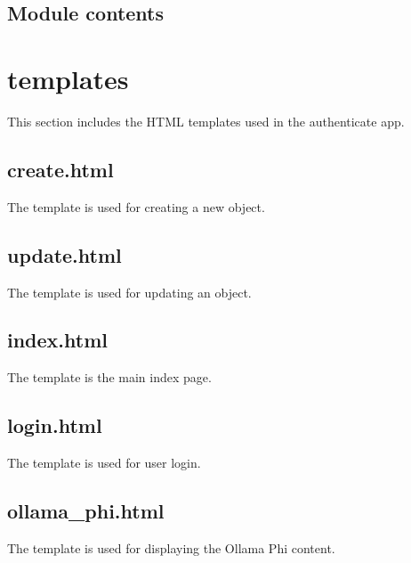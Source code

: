 \documentclass[letterpaper,10pt,english]{sphinxmanual}
\begin{document}
\section{Module contents}
\label{\detokenize{tasks:module-tasks}}\label{\detokenize{tasks:module-contents}}
\sphinxstepscope


\chapter{templates}
\label{\detokenize{templates:templates}}\label{\detokenize{templates::doc}}
\sphinxAtStartPar
This section includes the HTML templates used in the authenticate app.


\section{create.html}
\label{\detokenize{templates:create-html}}
\sphinxAtStartPar
The  template is used for creating a new object.


\section{update.html}
\label{\detokenize{templates:update-html}}
\sphinxAtStartPar
The  template is used for updating an object.


\section{index.html}
\label{\detokenize{templates:index-html}}
\sphinxAtStartPar
The  template is the main index page.


\section{login.html}
\label{\detokenize{templates:login-html}}
\sphinxAtStartPar
The  template is used for user login.


\section{ollama\_phi.html}
\label{\detokenize{templates:ollama-phi-html}}
\sphinxAtStartPar
The  template is used for displaying the Ollama Phi content.
\end{document}
